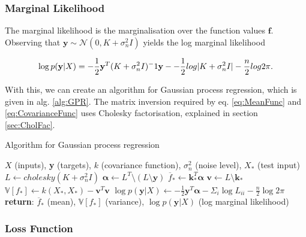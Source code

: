 \documentclass[12pt,a4paper]{report}
\theoremstyle{definition}
\begin{document}
\subsubsection{Marginal Likelihood}

The marginal likelihood is the marginalisation over the function values $\textbf{f}$. 
Observing that $\textbf{y} \sim \mathcal{N} (0, K + \sigma_{n}^2I)$ yields the log marginal likelihood

\begin{equation}
	\label{eq:LogMargLik}
	\centering
	\log p(\textbf{y} | X) = -\frac{1}{2}\textbf{y}^T(K +  \sigma_{n}^2I)^-1\textbf{y} - -\frac{1}{2}log|K +  \sigma_{n}^2I| - \frac{n}{2}log2\pi.
\end{equation}

With this, we can create an algorithm for Gaussian process regression, which is given in alg. \ref{alg:GPR}. The matrix inversion required by eq. \ref{eq:MeanFunc} and \ref{eq:CovarianceFunc} uses Cholesky factorisation, explained in section \ref{sec:CholFac}. 

\begin{algorithm}
	\caption{Algorithm for Gaussian process regression \citep{RasmussenWilliams2006}}
	\label{alg:GPR}
	\begin{algorithmic}[1]
		\Require $X$ (inputs), \textbf{y} (targets), $k$ (covariance function), $\sigma_{n}^2$ (noise level), $X_{*}$ (test input)	
		\State $L \gets cholesky(K +\sigma_{n}^2I)$
		\State $\boldsymbol{\alpha} \gets L^T \setminus (L \setminus \textbf{y})$ 
		\State $\overline{f}_{*} \gets \textbf{k}_{*}^T \boldsymbol{\alpha}$ 
		\State $\textbf{v} \gets L \setminus \textbf{k}_{*}$ 
		\State $\mathbb{V}[f_{*}] \gets k(X_{*}, X_{*}) - \textbf{v}^T\textbf{v}$ 
		\State $\log p(\textbf{y} | X) \gets -\frac{1}{2} \textbf{y}^T \boldsymbol{\alpha} - \Sigma_{i} \log L_{ii} - \frac{n}{2} \log2\pi$ 
		\State \textbf{return}: $\overline{f}_{*}$ (mean), $\mathbb{V}[f_{*}]$ (variance), $\log p(\textbf{y} | X)$ (log marginal likelihood)
	\end{algorithmic}
\end{algorithm}

\subsubsection{Loss Function}
\end{document}
